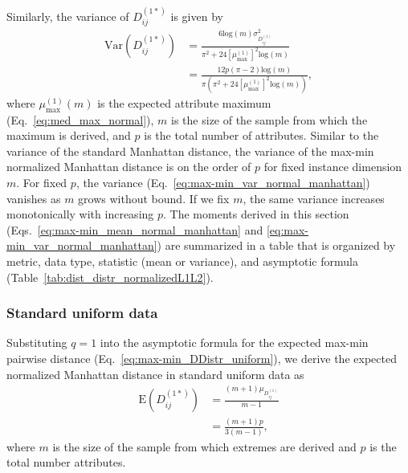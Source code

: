 \documentclass[aoas]{imsart}
\begin{document}
Similarly, the variance of $D^{(1*)}_{ij}$ is given by
%
\begin{equation}\label{eq:max-min_var_normal_manhattan}
\begin{aligned}
\text{Var}\left(D^{(1*)}_{ij}\right) &= \frac{6\text{log}(m)\sigma^2_{D^{(1)}_{ij}}}{\pi^2 + 24\left[\mu^{(1)}_\text{max}\right]^2\text{log}(m)} \\
&= \frac{12p(\pi-2)\text{log}(m)}{\pi\left(\pi^2 + 24\left[\mu^{(1)}_\text{max}\right]^2\text{log}(m)\right)},
\end{aligned}
\end{equation}
%
where $\mu^{(1)}_\text{max}(m)$ is the expected attribute maximum (Eq.~\ref{eq:med_max_normal}), $m$ is the size of the sample from which the maximum is derived, and $p$ is the total number of attributes. Similar to the variance of the standard Manhattan distance, the variance of the max-min normalized Manhattan distance is on the order of $p$ for fixed instance dimension $m$. For fixed $p$, the variance (Eq.~\ref{eq:max-min_var_normal_manhattan}) vanishes as $m$ grows without bound. If we fix $m$, the same variance increases monotonically with increasing $p$. The moments derived in this section (Eqs.~\ref{eq:max-min_mean_normal_manhattan} and \ref{eq:max-min_var_normal_manhattan}) are summarized in a table that is organized by metric, data type, statistic (mean or variance), and asymptotic formula (Table~\ref{tab:dist_distr_normalizedL1L2}).

\subsubsection{Standard uniform data}

Substituting $q=1$ into the asymptotic formula for the expected max-min pairwise distance (Eq.~\ref{eq:max-min_DDistr_uniform}), we derive the expected normalized Manhattan distance in standard uniform data as
%
\begin{equation}\label{eq:max-min_mean_uniform_manhattan}
\begin{aligned}
\text{E}\left(D^{(1*)}_{ij}\right) &= \frac{(m+1)\mu_{D^{(1)}_{ij}}}{m-1} \\
&= \frac{(m+1)p}{3(m-1)},
\end{aligned}
\end{equation}
%
where $m$ is the size of the sample from which extremes are derived and $p$ is the total number attributes.
\end{document}
